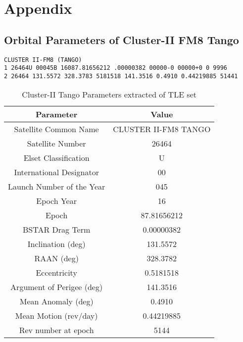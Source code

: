 %
\section*{Appendix}
\renewcommand{\thesection}{\Alph{subsection}}


\subsection{Orbital Parameters of Cluster-II FM8 Tango}
\label{tleParameters}
\texttt{CLUSTER II-FM8 (TANGO)\\
1 26464U 00045B 16087.81656212 .00000382 00000-0 00000+0 0 9996\\
2 26464 131.5572 328.3783 5181518 141.3516 0.4910 0.44219885 51441}


\vspace{1em}

\begin{table}[h!]
\centering
\caption{Cluster-II Tango Parameters extracted of TLE set}
\label{table:tle}
\begin{tabular}{|c | c|} 
 \hline
 \textbf{Parameter} & \textbf{Value} \\ [0.5ex] 
 \hline
 Satellite Common Name &  CLUSTER II-FM8 TANGO\\ 
 Satellite Number &  26464\\
 Elset Classification &  U\\
 International Designator &  00\\
 Launch Number of the Year & 045\\
 Epoch Year & 16\\
 Epoch & 87.81656212\\
 BSTAR Drag Term &  0.00000382\\
 Inclination (deg) &  131.5572\\
 RAAN (deg) &  328.3782\\
 Eccentricity &  0.5181518\\
 Argument of Perigee (deg) &  141.3516\\
 Mean Anomaly (deg) &  0.4910\\
 Mean Motion (rev/day) &  0.44219885\\
 Rev number at epoch &  5144 \\ [1ex] 
 \hline
\end{tabular}
\end{table}
